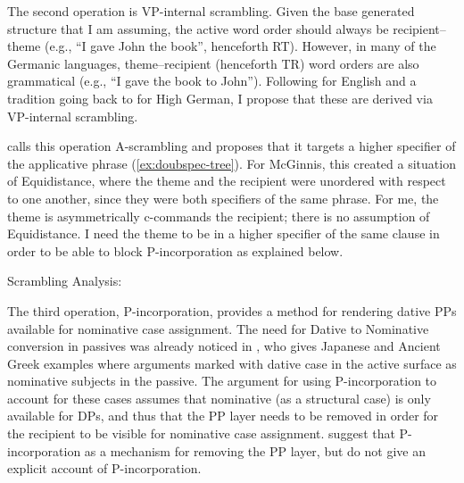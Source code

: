 The second operation is VP-internal scrambling. Given the base generated structure that I am assuming, the active word order should always be recipient--theme (e.g., ``I gave John the book'', henceforth RT). However, in many of the Germanic languages, theme--recipient (henceforth TR) word orders are also grammatical (e.g., ``I gave the book to John''). Following \cite{Takano.1998} for English and a tradition going back to \cite{Lenerz.1977} for High German, I propose that these are derived via VP-internal scrambling.

\cite{McGinnis.1998} calls this operation A-scrambling and proposes that it targets a higher specifier of the applicative phrase (\ref{ex:doubspec-tree}). For McGinnis, this created a situation of Equidistance, where the theme and the recipient were unordered with respect to one another, since they were both specifiers of the same phrase. For me, the theme is asymmetrically c-commands the recipient; there is no assumption of Equidistance. I need the theme to be in a higher specifier of the same clause in order to be able to block P-incorporation as explained below. 

\begin{exe}
	\ex Scrambling Analysis:\label{ex:doubspec-tree}
 \end{exe} 

 The third operation, P-incorporation, provides a method for rendering dative PPs available for nominative case assignment. The need for Dative to Nominative conversion in passives was already noticed in \cite{Larson.1988}, who gives Japanese and Ancient Greek examples where arguments marked with dative case in the active surface as nominative subjects in the passive. The argument for using P-incorporation to account for these cases assumes that nominative (as a structural case) is only available for DPs, and thus that the PP layer needs to be removed in order for the recipient to be visible for nominative case assignment. \cite{Alexiadou.2014} suggest that P-incorporation as a mechanism for removing the PP layer, but do not give an explicit account of P-incorporation. 

